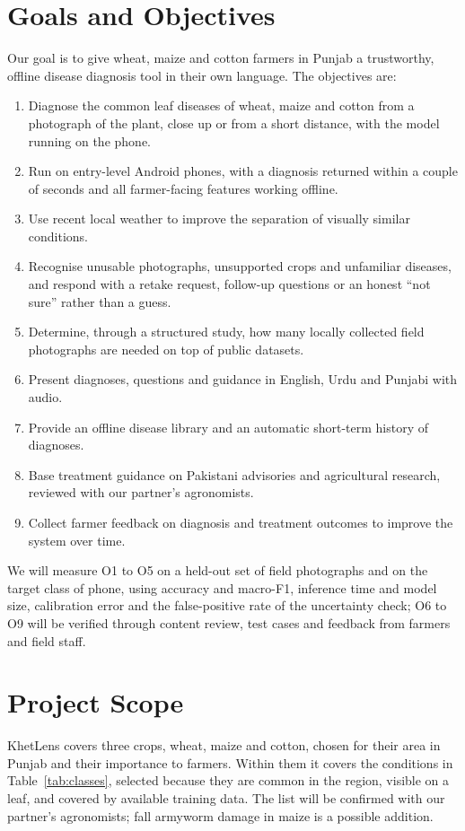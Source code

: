 \section{Goals and Objectives}
\label{sec:goals}
Our goal is to give wheat, maize and cotton farmers in Punjab a trustworthy, offline disease diagnosis tool in their own language. The objectives are:
\begin{enumerate}[label=\textbf{O\arabic*},leftmargin=2.2em]
  \item Diagnose the common leaf diseases of wheat, maize and cotton from a photograph of the plant, close up or from a short distance, with the model running on the phone.
  \item Run on entry-level Android phones, with a diagnosis returned within a couple of seconds and all farmer-facing features working offline.
  \item Use recent local weather to improve the separation of visually similar conditions.
  \item Recognise unusable photographs, unsupported crops and unfamiliar diseases, and respond with a retake request, follow-up questions or an honest ``not sure'' rather than a guess.
  \item Determine, through a structured study, how many locally collected field photographs are needed on top of public datasets.
  \item Present diagnoses, questions and guidance in English, Urdu and Punjabi with audio.
  \item Provide an offline disease library and an automatic short-term history of diagnoses.
  \item Base treatment guidance on Pakistani advisories and agricultural research, reviewed with our partner's agronomists.
  \item Collect farmer feedback on diagnosis and treatment outcomes to improve the system over time.
\end{enumerate}
We will measure O1 to O5 on a held-out set of field photographs and on the target class of phone, using accuracy and macro-F1, inference time and model size, calibration error and the false-positive rate of the uncertainty check; O6 to O9 will be verified through content review, test cases and feedback from farmers and field staff.

\section{Project Scope}
\label{sec:scope}
KhetLens covers three crops, wheat, maize and cotton, chosen for their area in Punjab and their importance to farmers. Within them it covers the conditions in Table~\ref{tab:classes}, selected because they are common in the region, visible on a leaf, and covered by available training data. The list will be confirmed with our partner's agronomists; fall armyworm damage in maize is a possible addition.

